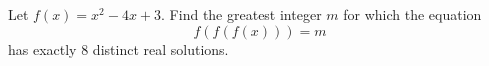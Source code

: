 Let $f(x)=x^2-4x+3$. Find the greatest integer $m$ for which the equation
\[f(f(f(x)))=m\]
has exactly $8$ distinct real solutions.

